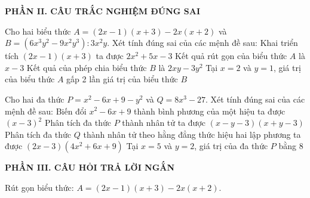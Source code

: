 \documentclass[12pt,a4paper]{article}
\begin{document}
\setcounter{ex}{0}
\noindent\textbf{\large PHẦN II. CÂU TRẮC NGHIỆM ĐÚNG SAI}
\vspace{1mm}
\begin{ex}
Cho hai biểu thức $A = (2x - 1)(x + 3) - 2x(x + 2)$ và $B = (6x^3y^2 - 9x^2y^3) : 3x^2y$. Xét tính đúng sai của các mệnh đề sau:
\choiceTF
{\True Khai triển tích $(2x - 1)(x + 3)$ ta được $2x^2 + 5x - 3$}
{\True Kết quả rút gọn của biểu thức $A$ là $x - 3$}
{\True Kết quả của phép chia biểu thức $B$ là $2xy - 3y^2$}
{Tại $x = 2$ và $y = 1$, giá trị của biểu thức $A$ gấp 2 lần giá trị của biểu thức $B$}
\end{ex}

\begin{ex}
Cho hai đa thức $P = x^2 - 6x + 9 - y^2$ và $Q = 8x^3 - 27$. Xét tính đúng sai của các mệnh đề sau:
\choiceTF
{\True Biến đổi $x^2 - 6x + 9$ thành bình phương của một hiệu ta được $(x - 3)^2$}
{\True Phân tích đa thức $P$ thành nhân tử ta được $(x - y - 3)(x + y - 3)$}
{\True Phân tích đa thức $Q$ thành nhân tử theo hằng đẳng thức hiệu hai lập phương ta được $(2x - 3)(4x^2 + 6x + 9)$}
{Tại $x = 5$ và $y = 2$, giá trị của đa thức $P$ bằng 8}
\end{ex}


\setcounter{ex}{0}
\noindent\textbf{\large PHẦN III. CÂU HỎI TRẢ LỜI NGẮN}
\vspace{1mm}
\begin{ex}
Rút gọn biểu thức: $A = (2x - 1)(x + 3) - 2x(x + 2)$. 
\end{ex}
\end{document}
